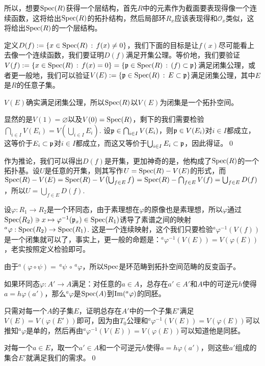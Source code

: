 所以，想要$\operatorname{Spec}(R)$获得一个层结构，首先$R$中的元素作为截面要表现得像一个连续函数，这将给出$\operatorname{Spec}(R)$的拓扑结构，然后局部环$R_x$应该表现得和$\mathcal{O}_x$类似，这将给出$\operatorname{Spec}(R)$的一个层结构。

\para 定义$D(f):=\{x\in \operatorname{Spec}(R)\,:\, f(x)\neq 0\}$，我们下面的目标是让$f(x)$尽可能看上去像一个连续函数，我们要证明$D(f)$满足开集公理。等价地，我们要验证$V(f):=\{x\in \operatorname{Spec}(R)\,:\, f(x)=0\}=\{\mathfrak{p}\in \operatorname{Spec}(R)\,:\, (f)\subset \mathfrak{p}\}$满足闭集公理，或者更一般地，我们可以验证$V(E):=\{\mathfrak{p}\in \operatorname{Spec}(R)\,:\, E\subset \mathfrak{p}\}$满足闭集公理，其中$E$是$R$的任意子集。

\pro $V(E)$确实满足闭集公理，所以$\operatorname{Spec}(R)$以$V(E)$为闭集是一个拓扑空间。

\proof 显然的是$V(1)=\varnothing$以及$V(0)=\operatorname{Spec}(R)$，剩下的我们需要检验$\bigcap_{i\in I}V(E_i)=V(\bigcup_{i\in I}E_i)$. 设$\mathfrak{p} \in \bigcap_{i\in I}V(E_i)$，则$\mathfrak{p}\in V(E_i)$对$i\in I$都成立，这等价于$E_i\subset \mathfrak{p}$对$i\in I$都成立，而这又等价于$\bigcup_{i\in I}E_i \subset \mathfrak{p}$，因此得证。\qed

作为推论，我们可以得出$D(f)$是开集，更加神奇的是，他构成了$\operatorname{Spec}(R)$的一个拓扑基。设$U$是任意的开集，则其写作$U=\operatorname{Spec}(R)-V(E)$的形式，而$\operatorname{Spec}(R)-V(E)=\operatorname{Spec}(R)-V\bigl(\bigcup_{f\in E} f\bigr)=\operatorname{Spec}(R)-\bigcap_{f\in E}V(f)=\bigcup_{f\in E}D(f)$，所以$U=\bigcup_{f\in E}D(f)$.

\para 设$\varphi:R_1\to R_2$是一个环同态，由于素理想在$\varphi$的原像也是素理想，所以$\varphi$通过$\operatorname{Spec}(R_2)\ni x\mapsto \varphi^{-1}(\mathfrak{p}_x)\in \operatorname{Spec}(R_1)$诱导了素谱之间的映射$^a\varphi:\operatorname{Spec}(R_2)\to \operatorname{Spec}(R_1)$. 这是一个连续映射，这个我们只要检验$^a\varphi^{-1}(V(f))$是一个闭集就可以了，事实上，更一般的命题是：$^a\varphi^{-1}(V(E))=V(\varphi(E))$，老实按照定义检验即可。

由于$^a(\varphi\circ \psi)=\,^a\psi \,\circ\,^a\varphi$，所以$\operatorname{Spec}$是环范畴到拓扑空间范畴的反变函子。

\pro 如果环同态$\varphi:A'\to A$满足：对任意的$a\in A$，总存在$a'\in A'$和$A$中的可逆元$h$使得$a=h\varphi(a')$，那么$^a\varphi$是$\operatorname{Spec}(A)$到$\operatorname{Im} (^a\varphi)$的同胚。

\proof 只需对每一个$A$的子集$E$，证明总存在$A'$中的一个子集$E'$满足$V(E)=V(\varphi(E'))$即可，因为由$T_0$公理和$^a\varphi^{-1}(V(E))=V(\varphi(E))$可以推知$^a\varphi$是单的，然后再由$^a\varphi^{-1}(V(E))=V(\varphi(E))$可以知道他是同胚。

对每一个$a\in E$，取一个$a'\in A$和一个可逆元$h$使得$a=h\varphi(a')$，则这些$a'$组成的集合$E'$就满足我们的需求。\qed

